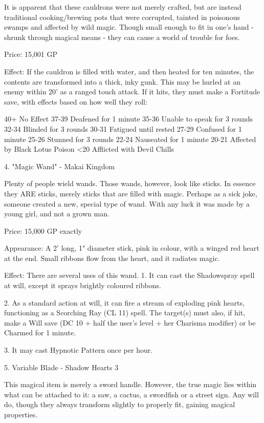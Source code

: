 \begin{multicols}{2}
It is apparent that these cauldrons were not merely crafted, but are instead traditional cooking/brewing pots that were corrupted, tainted in poisonous swamps and affected by wild magic. Though small enough to fit in one's hand - shrunk through magical means - they can cause a world of trouble for foes.

Price: 15,001 GP

Effect: If the cauldron is filled with water, and then heated for ten minutes, the contents are transformed into a thick, inky gunk. This may be hurled at an enemy within 20' as a ranged touch attack. If it hits, they must make a Fortitude save, with effects based on how well they roll:

40+ No Effect
37-39 Deafened for 1 minute
35-36 Unable to speak for 3 rounds
32-34 Blinded for 3 rounds
30-31 Fatigued until rested
27-29 Confused for 1 minute
25-26 Stunned for 3 rounds
22-24 Nauseated for 1 minute
20-21 Affected by Black Lotus Poison
<20 Afflicted with Devil Chills


4. "Magic Wand" - Makai Kingdom

Plenty of people wield wands. Those wands, however, look like sticks. In essence they ARE sticks, merely sticks that are filled with magic. Perhaps as a sick joke, someone created a new, special type of wand. With any luck it was made by a young girl, and not a grown man.

Price: 15,000 GP exactly

Appearance: A 2' long, 1" diameter stick, pink in colour, with a winged red heart at the end. Small ribbons flow from the heart, and it radiates magic.

Effect:
There are several uses of this wand.
1. It can cast the Shadowspray spell at will, except it sprays brightly coloured ribbons.

2. As a standard action at will, it can fire a stream of exploding pink hearts, functioning as a Scorching Ray (CL 11) spell. The target(s) must also, if hit, make a Will save (DC 10 + half the user's level + her Charisma modifier) or be Charmed for 1 minute.

3. It may cast Hypnotic Pattern once per hour.


5. Variable Blade - Shadow Hearts 3

This magical item is merely a sword handle. However, the true magic lies within what can be attached to it: a saw, a cactus, a swordfish or a street sign. Any will do, though they always transform slightly to properly fit, gaining magical properties.


\end{multicols}
